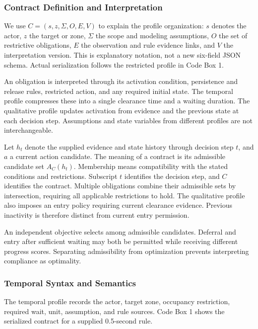 \documentclass[nolineno]{ieeeaccess}
\begin{document}
\subsubsection{Contract Definition and Interpretation}

We use $C = (s, z, \Sigma, O, E, V)$ to explain the profile organization: $s$ denotes the actor, $z$ the target or zone, $\Sigma$ the scope and modeling assumptions, $O$ the set of restrictive obligations, $E$ the observation and rule evidence links, and $V$ the interpretation version. This is explanatory notation, not a new six-field JSON schema. Actual serialization follows the restricted profile in Code Box 1.\par

An obligation is interpreted through its activation condition, persistence and release rules, restricted action, and any required initial state. The temporal profile compresses these into a single clearance time and a waiting duration. The qualitative profile updates activation from evidence and the previous state at each decision step. Assumptions and state variables from different profiles are not interchangeable.\par

Let $h_t$ denote the supplied evidence and state history through decision step $t$, and $a$ a current action candidate. The meaning of a contract is its admissible candidate set $A_C(h_t)$. Membership means compatibility with the stated conditions and restrictions. Subscript $t$ identifies the decision step, and $C$ identifies the contract. Multiple obligations combine their admissible sets by intersection, requiring all applicable restrictions to hold. The qualitative profile also imposes an entry policy requiring current clearance evidence. Previous inactivity is therefore distinct from current entry permission.\par

An independent objective selects among admissible candidates. Deferral and entry after sufficient waiting may both be permitted while receiving different progress scores. Separating admissibility from optimization prevents interpreting compliance as optimality.\par

\subsubsection{Temporal Syntax and Semantics}

The temporal profile records the actor, target zone, occupancy restriction, required wait, unit, assumption, and rule sources. Code Box 1 shows the serialized contract for a supplied 0.5-second rule.\par
\end{document}
